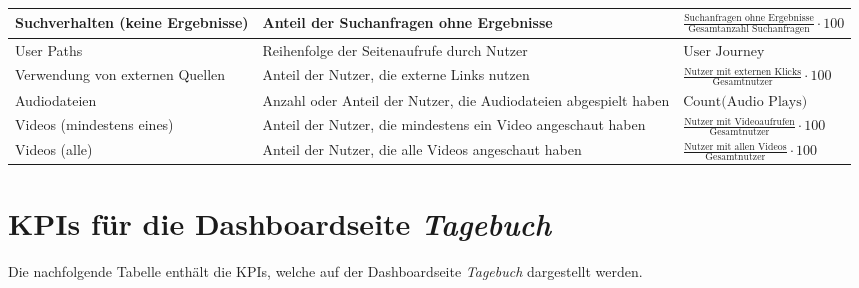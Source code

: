 \begin{xltabular}{\textwidth}{|X|X|X|}
    Suchverhalten (keine Ergebnisse) & Anteil der Suchanfragen ohne Ergebnisse & {\footnotesize \(\frac{\text{Suchanfragen ohne Ergebnisse}}{\text{Gesamtanzahl Suchanfragen}} \cdot 100\)} \\ \hline
    User Paths & Reihenfolge der Seitenaufrufe durch Nutzer & {\footnotesize \(\text{User Journey}\)} \\ \hline
    Verwendung von externen Quellen & Anteil der Nutzer, die externe Links nutzen & {\footnotesize \(\frac{\text{Nutzer mit externen Klicks}}{\text{Gesamtnutzer}} \cdot 100\)} \\ \hline
    Audiodateien & Anzahl oder Anteil der Nutzer, die Audiodateien abgespielt haben & {\footnotesize \(\text{Count(Audio Plays)}\)} \\ \hline
    Videos (mindestens eines) & Anteil der Nutzer, die mindestens ein Video angeschaut haben & {\footnotesize \(\frac{\text{Nutzer mit Videoaufrufen}}{\text{Gesamtnutzer}} \cdot 100\)} \\ \hline
    Videos (alle) & Anteil der Nutzer, die alle Videos angeschaut haben & {\footnotesize \(\frac{\text{Nutzer mit allen Videos}}{\text{Gesamtnutzer}} \cdot 100\)} \\ \hline
\end{xltabular}

\section{KPIs für die Dashboardseite \textit{Tagebuch}}
Die nachfolgende Tabelle enthält die KPIs, welche auf der Dashboardseite \textit{Tagebuch} dargestellt werden.

